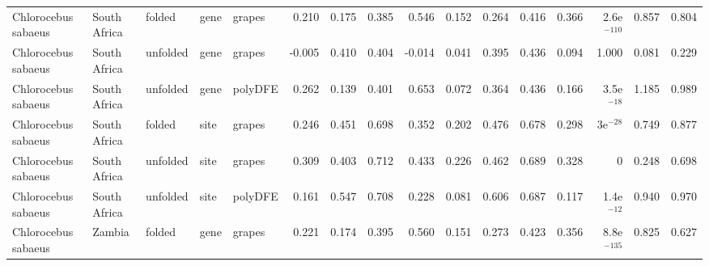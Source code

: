 \begin{longtable}{lllllrrrrrrrrrrr}
 Chlorocebus sabaeus &              South Africa &    folded &  gene &   grapes &                              0.210 &                               0.175 &                 0.385 &                 0.546 &                              0.152 &                               0.264 &                 0.416 &                 0.366 & 2.6e$^{-110}$ &  0.857 &  0.804 \\
 Chlorocebus sabaeus &              South Africa &  unfolded &  gene &   grapes &                             -0.005 &                               0.410 &                 0.404 &                -0.014 &                              0.041 &                               0.395 &                 0.436 &                 0.094 &         1.000 &  0.081 &  0.229 \\
 Chlorocebus sabaeus &              South Africa &  unfolded &  gene &  polyDFE &                              0.262 &                               0.139 &                 0.401 &                 0.653 &                              0.072 &                               0.364 &                 0.436 &                 0.166 &  3.5e$^{-18}$ &  1.185 &  0.989 \\
 Chlorocebus sabaeus &              South Africa &    folded &  site &   grapes &                              0.246 &                               0.451 &                 0.698 &                 0.352 &                              0.202 &                               0.476 &                 0.678 &                 0.298 &    3e$^{-28}$ &  0.749 &  0.877 \\
 Chlorocebus sabaeus &              South Africa &  unfolded &  site &   grapes &                              0.309 &                               0.403 &                 0.712 &                 0.433 &                              0.226 &                               0.462 &                 0.689 &                 0.328 &             0 &  0.248 &  0.698 \\
 Chlorocebus sabaeus &              South Africa &  unfolded &  site &  polyDFE &                              0.161 &                               0.547 &                 0.708 &                 0.228 &                              0.081 &                               0.606 &                 0.687 &                 0.117 &  1.4e$^{-12}$ &  0.940 &  0.970 \\
 Chlorocebus sabaeus &                    Zambia &    folded &  gene &   grapes &                              0.221 &                               0.174 &                 0.395 &                 0.560 &                              0.151 &                               0.273 &                 0.423 &                 0.356 & 8.8e$^{-135}$ &  0.825 &  0.627 \\

\end{longtable}

